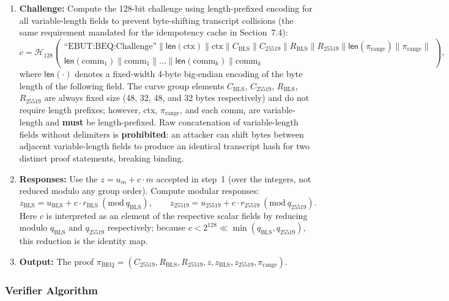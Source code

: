\documentclass[11pt]{article}
\theoremstyle{definitionstyle}
\theoremstyle{plain}
\newcommand{\pmod}[1]{\ (\mathrm{mod}\ #1)}
\begin{document}
\begin{enumerate}[leftmargin=*]
\item \textbf{Challenge:}
  Compute the 128-bit challenge using length-prefixed encoding for all variable-length fields to prevent byte-shifting transcript collisions (the same requirement mandated for the idempotency cache in Section~7.4):
  \[
  c = \mathcal{H}_{128}\!\left(
  \begin{array}{l}
  \text{``EBUT:BEQ:Challenge''} \parallel
  \mathsf{len}(\text{ctx}) \parallel \text{ctx} \parallel
  C_{\text{BLS}} \parallel C_{25519} \parallel
  R_{\text{BLS}} \parallel R_{25519} \parallel
  \mathsf{len}(\pi_{\text{range}}) \parallel \pi_{\text{range}} \parallel \\
  \mathsf{len}(\text{comm}_1) \parallel \text{comm}_1 \parallel \dots \parallel
  \mathsf{len}(\text{comm}_k) \parallel \text{comm}_k
  \end{array}
  \right),
  \]
  where $\mathsf{len}(\cdot)$ denotes a fixed-width 4-byte big-endian encoding of the byte length of the following field. The curve group elements $C_{\text{BLS}}$, $C_{25519}$, $R_{\text{BLS}}$, $R_{25519}$ are always fixed size (48, 32, 48, and 32 bytes respectively) and do not require length prefixes; however, $\text{ctx}$, $\pi_{\text{range}}$, and each $\text{comm}_i$ are variable-length and \textbf{must} be length-prefixed. Raw concatenation of variable-length fields without delimiters is \textbf{prohibited}: an attacker can shift bytes between adjacent variable-length fields to produce an identical transcript hash for two distinct proof statements, breaking binding.

\item \textbf{Responses:}
  Use the $z = u_m + c \cdot m$ accepted in step~1 (over the integers, not reduced modulo any group order).
  Compute modular responses:
  \[
  z_{\text{BLS}} = u_{\text{BLS}} + c \cdot r_{\text{BLS}} \pmod{q_{\text{BLS}}}, \qquad
  z_{25519} = u_{25519} + c \cdot r_{25519} \pmod{q_{25519}}.
  \]
  Here $c$ is interpreted as an element of the respective scalar fields by reducing modulo $q_{\text{BLS}}$ and $q_{25519}$ respectively; because $c < 2^{128} \ll \min(q_{\text{BLS}}, q_{25519})$, this reduction is the identity map.

\item \textbf{Output:}
  The proof $\pi_{\text{BEQ}} = (C_{25519}, R_{\text{BLS}}, R_{25519}, z, z_{\text{BLS}}, z_{25519}, \pi_{\text{range}})$.
\end{enumerate}

\subsubsection{Verifier Algorithm}
\end{document}
